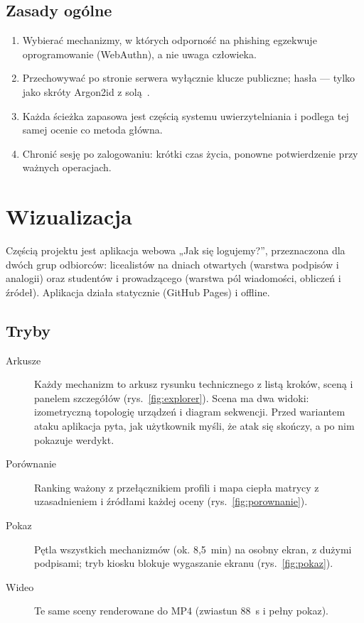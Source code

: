 \documentclass[11pt,a4paper]{article}
\begin{document}
\subsection{Zasady ogólne}
\begin{enumerate}
  \item Wybierać mechanizmy, w których odporność na phishing egzekwuje oprogramowanie (WebAuthn), a nie uwaga człowieka.
  \item Przechowywać po stronie serwera wyłącznie klucze publiczne; hasła --- tylko jako skróty Argon2id z solą~\cite{X4}.
  \item Każda ścieżka zapasowa jest częścią systemu uwierzytelniania i podlega tej samej ocenie co metoda główna.
  \item Chronić sesję po zalogowaniu: krótki czas życia, ponowne potwierdzenie przy ważnych operacjach.
\end{enumerate}

\section{Wizualizacja}\label{sec:wizualizacja}

Częścią projektu jest aplikacja webowa „Jak się logujemy?”, przeznaczona dla dwóch grup odbiorców: licealistów na dniach otwartych (warstwa podpisów i analogii) oraz studentów i prowadzącego (warstwa pól wiadomości, obliczeń i źródeł). Aplikacja działa statycznie (GitHub Pages) i offline.

\subsection{Tryby}
\begin{description}
  \item[Arkusze] Każdy mechanizm to arkusz rysunku technicznego z listą kroków, sceną i panelem szczegółów (rys.~\ref{fig:explorer}). Scena ma dwa widoki: izometryczną topologię urządzeń i diagram sekwencji. Przed wariantem ataku aplikacja pyta, jak użytkownik myśli, że atak się skończy, a po nim pokazuje werdykt.
  \item[Porównanie] Ranking ważony z przełącznikiem profili i mapa ciepła matrycy z uzasadnieniem i źródłami każdej oceny (rys.~\ref{fig:porownanie}).
  \item[Pokaz] Pętla wszystkich mechanizmów (ok. 8,5~min) na osobny ekran, z dużymi podpisami; tryb kiosku blokuje wygaszanie ekranu (rys.~\ref{fig:pokaz}).
  \item[Wideo] Te same sceny renderowane do MP4 (zwiastun 88~s i pełny pokaz).
\end{description}
\end{document}
